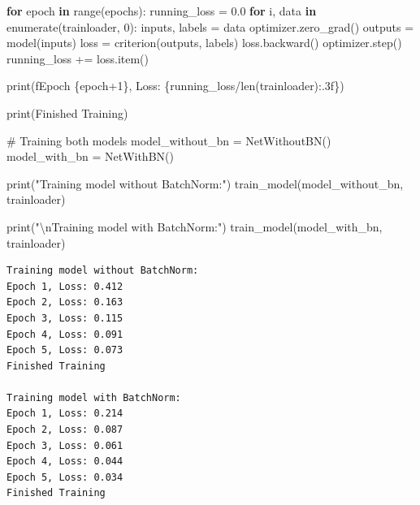 \documentclass[
  letterpaper,
  DIV=11,
  numbers=noendperiod]{scrreprt}
\newenvironment{Shaded}{\begin{snugshade}}{\end{snugshade}}
\newcommand{\BuiltInTok}[1]{\textcolor[rgb]{0.00,0.23,0.31}{#1}}
\newcommand{\CharTok}[1]{\textcolor[rgb]{0.13,0.47,0.30}{#1}}
\newcommand{\CommentTok}[1]{\textcolor[rgb]{0.37,0.37,0.37}{#1}}
\newcommand{\ControlFlowTok}[1]{\textcolor[rgb]{0.00,0.23,0.31}{\textbf{#1}}}
\newcommand{\DecValTok}[1]{\textcolor[rgb]{0.68,0.00,0.00}{#1}}
\newcommand{\FloatTok}[1]{\textcolor[rgb]{0.68,0.00,0.00}{#1}}
\newcommand{\KeywordTok}[1]{\textcolor[rgb]{0.00,0.23,0.31}{\textbf{#1}}}
\newcommand{\NormalTok}[1]{\textcolor[rgb]{0.00,0.23,0.31}{#1}}
\newcommand{\OperatorTok}[1]{\textcolor[rgb]{0.37,0.37,0.37}{#1}}
\newcommand{\SpecialCharTok}[1]{\textcolor[rgb]{0.37,0.37,0.37}{#1}}
\newcommand{\SpecialStringTok}[1]{\textcolor[rgb]{0.13,0.47,0.30}{#1}}
\newcommand{\StringTok}[1]{\textcolor[rgb]{0.13,0.47,0.30}{#1}}
\begin{document}
\begin{Shaded}
\begin{Highlighting}[]
    \ControlFlowTok{for}\NormalTok{ epoch }\KeywordTok{in} \BuiltInTok{range}\NormalTok{(epochs):}
\NormalTok{        running\_loss }\OperatorTok{=} \FloatTok{0.0}
        \ControlFlowTok{for}\NormalTok{ i, data }\KeywordTok{in} \BuiltInTok{enumerate}\NormalTok{(trainloader, }\DecValTok{0}\NormalTok{):}
\NormalTok{            inputs, labels }\OperatorTok{=}\NormalTok{ data}
\NormalTok{            optimizer.zero\_grad()}
\NormalTok{            outputs }\OperatorTok{=}\NormalTok{ model(inputs)}
\NormalTok{            loss }\OperatorTok{=}\NormalTok{ criterion(outputs, labels)}
\NormalTok{            loss.backward()}
\NormalTok{            optimizer.step()}
\NormalTok{            running\_loss }\OperatorTok{+=}\NormalTok{ loss.item()}
            
        \BuiltInTok{print}\NormalTok{(}\SpecialStringTok{f\textquotesingle{}Epoch }\SpecialCharTok{\{}\NormalTok{epoch}\OperatorTok{+}\DecValTok{1}\SpecialCharTok{\}}\SpecialStringTok{, Loss: }\SpecialCharTok{\{}\NormalTok{running\_loss}\OperatorTok{/}\BuiltInTok{len}\NormalTok{(trainloader)}\SpecialCharTok{:.3f\}}\SpecialStringTok{\textquotesingle{}}\NormalTok{)}
    
    \BuiltInTok{print}\NormalTok{(}\StringTok{\textquotesingle{}Finished Training\textquotesingle{}}\NormalTok{)}

\CommentTok{\# Training both models}
\NormalTok{model\_without\_bn }\OperatorTok{=}\NormalTok{ NetWithoutBN()}
\NormalTok{model\_with\_bn }\OperatorTok{=}\NormalTok{ NetWithBN()}

\BuiltInTok{print}\NormalTok{(}\StringTok{"Training model without BatchNorm:"}\NormalTok{)}
\NormalTok{train\_model(model\_without\_bn, trainloader)}

\BuiltInTok{print}\NormalTok{(}\StringTok{"}\CharTok{\textbackslash{}n}\StringTok{Training model with BatchNorm:"}\NormalTok{)}
\NormalTok{train\_model(model\_with\_bn, trainloader)}
\end{Highlighting}
\end{Shaded}

\begin{verbatim}
Training model without BatchNorm:
Epoch 1, Loss: 0.412
Epoch 2, Loss: 0.163
Epoch 3, Loss: 0.115
Epoch 4, Loss: 0.091
Epoch 5, Loss: 0.073
Finished Training

Training model with BatchNorm:
Epoch 1, Loss: 0.214
Epoch 2, Loss: 0.087
Epoch 3, Loss: 0.061
Epoch 4, Loss: 0.044
Epoch 5, Loss: 0.034
Finished Training
\end{verbatim}
\end{document}
